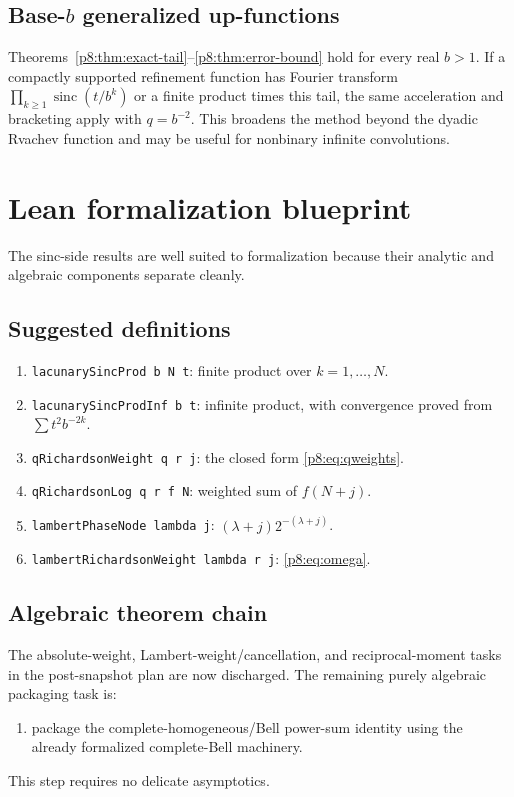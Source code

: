 \documentclass[11pt]{article}
\numberwithin{equation}{section}
\theoremstyle{definition}
\theoremstyle{remark}
\newcommand{\sinc}{\operatorname{sinc}}
\begin{document}
\subsection{Base-\texorpdfstring{$b$}{b} generalized up-functions}

Theorems~\ref{p8:thm:exact-tail}--\ref{p8:thm:error-bound} hold for every real $b>1$. If a compactly supported refinement function has Fourier transform
\(
\prod_{k\ge1}\sinc(t/b^k)
\)
or a finite product times this tail, the same acceleration and bracketing apply with $q=b^{-2}$. This broadens the method beyond the dyadic Rvachev function and may be useful for nonbinary infinite convolutions.

\section{Lean formalization blueprint}
\label{p8:sec:lean}

The sinc-side results are well suited to formalization because their analytic and algebraic components separate cleanly.

\subsection{Suggested definitions}

\begin{enumerate}
\item \texttt{lacunarySincProd b N t}: finite product over $k=1,\ldots,N$.
\item \texttt{lacunarySincProdInf b t}: infinite product, with convergence proved from $\sum t^2b^{-2k}$.
\item \texttt{qRichardsonWeight q r j}: the closed form \cref{p8:eq:qweights}.
\item \texttt{qRichardsonLog q r f N}: weighted sum of $f(N+j)$.
\item \texttt{lambertPhaseNode lambda j}: $(\lambda+j)2^{-(\lambda+j)}$.
\item \texttt{lambertRichardsonWeight lambda r j}: \cref{p8:eq:omega}.
\end{enumerate}

\subsection{Algebraic theorem chain}

The absolute-weight, Lambert-weight/cancellation, and reciprocal-moment tasks
in the post-snapshot plan are now discharged.  The remaining purely algebraic
packaging task is:
\begin{enumerate}
\item package the complete-homogeneous/Bell power-sum identity using the
      already formalized complete-Bell machinery.
\end{enumerate}
This step requires no delicate asymptotics.
\end{document}
